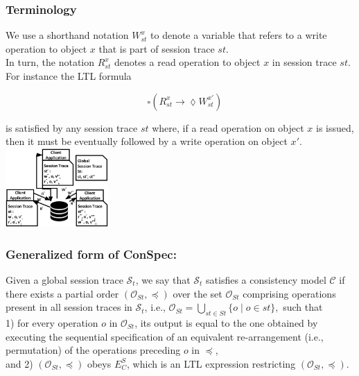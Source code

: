 \documentclass{beamer}
\begin{document}
 \begin{frame}
 \frametitle{Terminology}
 
 We use a shorthand notation $W^{x}_{st}$ to denote a variable that refers to a write operation to object $x$ that is part of session trace $st$. \\
 In turn, the notation $R^{x}_{st}$ denotes a read operation to object $x$ in session trace $st$.\\
 
 For instance the LTL formula
 
 $$ \quad \square \left( R_\mathit{st}^x \rightarrow \lozenge W_\mathit{st}^{x'} \right) $$
 
 \noindent is satisfied by any session trace $st$ where, if a read operation on object $x$ is issued, then it must be eventually followed by a write operation on object $x'$.
 	\includegraphics[height=3cm]{system.eps}
 
\end{frame}

\begin{frame}
\frametitle{Generalized form of ConSpec:}
	\begin{definition}{}\label{def:form0}
	Given a global session trace $\mathcal{S}_t$,
	we say  that $\mathcal{S}_t$ satisfies a consistency model $\mathcal{C}$
	if there exists a partial order $\left( {\mathcal{O}_{St}}, \preccurlyeq \right)$ over the set ${\mathcal{O}_{St}}$ comprising operations  present in all session traces in $\mathcal{S}_t$, i.e.,  ${\mathcal{O}_{St}} = \bigcup_{st \in St} \{ o \mid o \in st \},$
	such that \\
	1) for every operation $\mathit{o}$ in  ${\mathcal{O}_{St}}$, %
	its output is equal to the one obtained by executing the sequential specification of an  equivalent re-arrangement (i.e., permutation) %
	of the operations preceding $\mathit{o}$ in $\preccurlyeq$, \\
	and 2) $\left( {\mathcal{O}_{St}}, \preccurlyeq \right)$ obeys $E^S_C$, which is an LTL expression restricting $\left( {\mathcal{O}_{St}}, \preccurlyeq \right)$.
\end{definition}
\end{frame}
\end{document}
